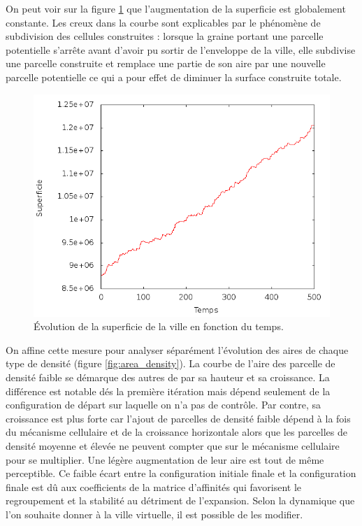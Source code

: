 \documentclass[10pt]{article}
\begin{document}
On peut voir sur la figure \ref{fig:area} que l'augmentation de la
superficie est globalement constante. Les creux dans la courbe sont
explicables par le phénomène de subdivision des cellules construites :
lorsque la graine portant une parcelle potentielle s'arrête avant
d'avoir pu sortir de l'enveloppe de la ville, elle subdivise une
parcelle construite et remplace une partie de son aire par une
nouvelle parcelle potentielle ce qui a pour effet de diminuer la
surface construite totale.

\begin{figure}[H]
  \centering
  \includegraphics[width=.8\linewidth]{images/area.png}
  \caption{Évolution de la superficie de la ville en fonction du temps.}
  \label{fig:area}
\end{figure}

On affine cette mesure pour analyser séparément l'évolution des aires
de chaque type de densité (figure \ref{fig:area_density}). La courbe
de l'aire des parcelle de densité faible se démarque des autres de par
sa hauteur et sa croissance. La différence est notable dés la première
itération mais dépend seulement de la configuration de départ sur
laquelle on n'a pas de contrôle. Par contre, sa croissance est plus
forte car l'ajout de parcelles de densité faible dépend à la fois du
mécanisme cellulaire et de la croissance horizontale alors que les
parcelles de densité moyenne et élevée ne peuvent compter que sur le
mécanisme cellulaire pour se multiplier. Une légère augmentation de
leur aire est tout de même perceptible. Ce faible écart entre la
configuration initiale finale et la configuration finale est dû aux
coefficients de la matrice d'affinités qui favorisent le regroupement
et la stabilité au détriment de l'expansion. Selon la dynamique que
l'on souhaite donner à la ville virtuelle, il est possible de les
modifier.
\end{document}
